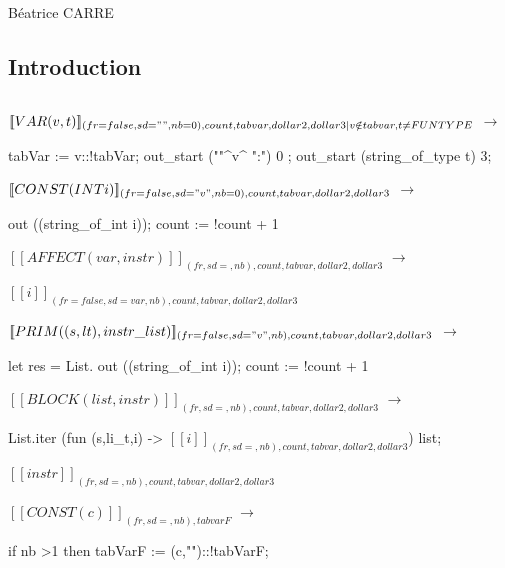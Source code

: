 \documentclass[a4paper, 11pt]{report}
\begin{document}
\chapter{}

Béatrice CARRE

\section*{Introduction}

\section{}


 $[\![ VAR(v,t) ]\!]
_{(fr=false,sd="",nb=0),count,tabvar,dollar2,dollar3 | v\notin tabvar, t\neq FUNTYPE} $
$\longrightarrow$
\begin{OCaml}
tabVar := v::!tabVar;  
out_start ("\n"^v^ ":") 0 ;  
out_start (string_of_type t) 3; 
\end{OCaml}


 $[\![ CONST(INT i) ]\!]
_{(fr=false,sd="v",nb=0),count,tabvar,dollar2,dollar3} $
$\longrightarrow$
\begin{OCaml}
out ((string_of_int i));
count := !count + 1
\end{OCaml}


 $[\![ AFFECT(var, instr) ]\!]
_{(fr,sd=,nb),count,tabvar,dollar2,dollar3} $
$\longrightarrow$
\begin{center}
 $[\![ i ]\!]
_{(fr=false,sd=var,nb),count,tabvar,dollar2,dollar3} $
\end{center}

 $[\![ PRIM((s,lt),instr\_list) ]\!]
_{(fr=false,sd="v",nb),count,tabvar,dollar2,dollar3} $
$\longrightarrow$
\begin{OCaml}
let res = List.
out ((string_of_int i));
count := !count + 1
\end{OCaml}

 $[\![ BLOCK(list, instr) ]\!]
_{(fr,sd=,nb),count,tabvar,dollar2,dollar3} $
$\longrightarrow$
\begin{center}
List.iter (fun (s,li\_t,i) -> $[\![ i ]\!]
_{(fr,sd=,nb),count,tabvar,dollar2,dollar3} $) list;

$[\![ instr ]\!]
_{(fr,sd=,nb),count,tabvar,dollar2,dollar3} $
\end{center}
$[\![ CONST(c) ]\!]
_{(fr,sd=,nb),tabvarF} $
$\longrightarrow$
\begin{OCaml}
  if nb >1 then
  tabVarF := (c,"")::!tabVarF;
\end{OCaml}
     
\end{document}
